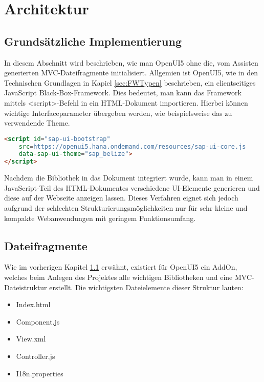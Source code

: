\section{Architektur}

\subsection{Grundsätzliche Implementierung}\label{sec_oGrund}

In diesem Abschnitt wird beschrieben, wie man OpenUI5 ohne die, vom Assisten generierten MVC-Dateifragmente initialisiert. Allgemien ist OpenUI5, wie in den Technischen Grundlagen in Kapiel \ref{sec:FWTypen} beschrieben, ein clientseitiges JavaScript Black-Box-Framework. Dies bedeutet, man kann das Framework mittels <script>-Befehl in ein HTML-Dokument importieren. Hierbei können wichtige Interfaceparameter übergeben werden, wie beispielsweise das zu verwendende Theme.

\begin{lstlisting}[caption=Beispiel für das Einbinden von OpenUI5, label=lst:UI5Einbinden, language=HTML]
<script id="sap-ui-bootstrap"
	src=https://openui5.hana.ondemand.com/resources/sap-ui-core.js
	data-sap-ui-theme="sap_belize">
</script>
\end{lstlisting}

Nachdem die Bibliothek in das Dokument integriert wurde, kann man in einem JavaScript-Teil des HTML-Dokumentes verschiedene UI-Elemente generieren und diese auf der Webseite anzeigen lassen. Dieses Verfahren eignet sich jedoch aufgrund der schlechten Strukturierungsmöglichkeiten nur für sehr kleine und kompakte Webanwendungen mit geringem Funktionsumfang. 

\subsection{Dateifragmente}\label{sec:oDateien}

Wie im vorherigen Kapitel \ref{sec_oGrund} erwähnt, existiert für OpenUI5 ein AddOn, welches beim Anlegen des Projektes alle wichtigen Bibliotheken und eine MVC-Dateistruktur erstellt. Die wichtigsten Dateielemente dieser Struktur lauten:

\begin{itemize}
	\item Index.html
	\item Component.js
	\item View.xml
	\item Controller.js
	\item I18n.properties
\end{itemize}

